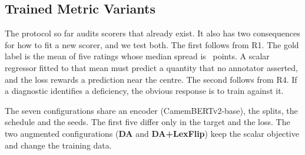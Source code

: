 \documentclass{BVP_JCLLT}
\newcommand{\rev}[1]{#1}
\newcommand{\rev}[1]{{\color{revcol}#1}}
\begin{document}
\subsection{Trained Metric Variants}\label{sec:variants}

\rev{The protocol so far audits scorers that already exist. It also has two
consequences for how to fit a new scorer, and we test both. The first follows
from R1. The gold label is the mean of five ratings whose median spread is
\medianRange\ points. A scalar regressor fitted to that mean must predict a
quantity that no annotator asserted, and the loss rewards a prediction near the
centre. The second follows from R4. If a diagnostic identifies a deficiency, the
obvious response is to train against it.

The seven configurations share an encoder (CamemBERTv2-base), the splits, the
schedule and the seeds. The first five differ only in the target and the loss.
The two augmented configurations (\textbf{DA} and \textbf{DA+LexFlip}) keep the
scalar objective and change the training data.

}
\end{document}
